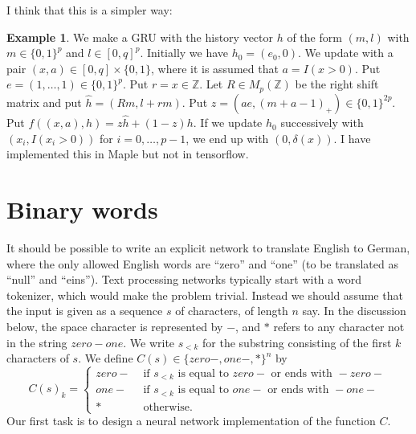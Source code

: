\documentclass{amsart}
\newcommand{\Z}         {{\mathbb{Z}}}
\newcommand{\dl}        {\delta}
\newcommand{\tm}        {\times}
\renewcommand{\:}{\colon}
\theoremstyle{definition}
\newtheorem{example}[theorem]{Example}
\begin{document}
I think that this is a simpler way:
\begin{example}
 We make a GRU with the history vector $h$ of the form $(m,l)$ with
 $m\in\{0,1\}^p$ and $l\in[0,q]^p$.  Initially we have $h_0=(e_0,0)$.
 We update with a pair $(x,a)\in[0,q]\tm\{0,1\}$, where it is assumed
 that $a=I(x>0)$.  Put $e=(1,\dotsc,1)\in\{0,1\}^p$.  Put
 $r=x\in\Z$.  Let $R\in M_p(\Z)$ be the right shift matrix
 and put $\widehat{h}=(Rm,l+rm)$.  Put
 $z=(ae,(m+a-1)_+)\in\{0,1\}^{2p}$.  Put
 $f((x,a),h)=z\widehat{h}+(1-z)h$.  If we update $h_0$ successively
 with $(x_i,I(x_i>0))$ for $i=0,\dotsc,p-1$, we end up with
 $(0,\dl(x))$.  I have implemented this in Maple but not in tensorflow.
\end{example}

\section{Binary words}

It should be possible to write an explicit network to translate
English to German, where the only allowed English words are ``zero''
and ``one'' (to be translated as ``null'' and ``eins'').  Text
processing networks typically start with a word tokenizer, which
would make the problem trivial.  Instead we should assume that the
input is given as a sequence $s$ of characters, of length $n$ say.
In the discussion below, the space character is represented by $-$,
and $*$ refers to any character not in the string $zero-one$.  We
write $s_{<k}$ for the substring consisting of the first $k$
characters of $s$.  We define $C(s)\in\{zero-,one-,*\}^n$ by 
\[ C(s)_k = \begin{cases}
    zero- & \text{ if } s_{<k} \text{ is equal to } 
             zero- \text{ or ends with } -zero- \\
    one- & \text{ if } s_{<k} \text{ is equal to } 
             one- \text{ or ends with } -one- \\
    * & \text{ otherwise. }
   \end{cases}
\]
Our first task is to design a neural network implementation of the
function $C$. 
\end{document}
